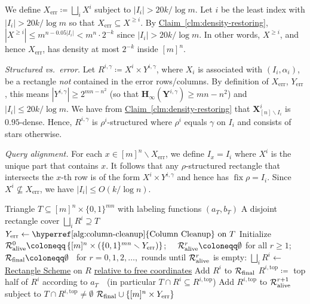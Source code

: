\documentclass[11pt]{article}
\numberwithin{equation}{section}
\theoremstyle{definition}
\theoremstyle{plain}
\newcommand{\expref}[2]{\hyperref[#2]{#1~\ref{#2}}}
\newcommand{\rectscheme}{\hyperref[alg:partition]{Rectangle Scheme}\xspace}
\newcommand{\columnclean}{\hyperref[alg:column-cleanup]{Column Cleanup}\xspace}
\newcommand{\Hmin}{\mathbf{H}_\infty}
\DeclareMathOperator{\fix}{fix}
\DeclareMathOperator{\err}{err}
\newcommand{\X}{\bm{X}}
\newcommand{\Y}{\bm{Y}}
\newcommand{\calR}{\mathcal{R}}
\newcommand{\allX}{[m]^n}
\newcommand{\allY}{\{0,1\}^{mn}}
\newcommand{\set}[1]{\left \{ #1 \right \}}
\newcommand{\alive}{\text{\upshape alive}}
\newcommand{\final}{\text{\upshape final}}
\newcommand{\topp}{\text{top}}
\begin{document}
We define $X_{\err} \coloneqq \bigsqcup_i X^i$ subject to $|I_i| > 20 k/\log m$. Let $i$ be the least index with $|I_{i}| > 20k/\log m$ so that $X_{\err} \subseteq X^{\geqslant i}$. By \expref{Claim}{clm:density-restoring}, $|X^{\geqslant i}| \le m^{n - 0.05 |I_i|} < m^{n} \cdot 2^{-k}$ since $|I_i| > 20 k /\log m$. In other words, $X^{\geqslant i}$, and hence $X_{\err}$, has density at most $2^{-k}$ inside $\allX$.
	
\medskip\noindent
\emph{Structured vs.\ error.}
Let $R^{i,\gamma}\coloneqq X^i\times Y^{i,\gamma}$, where $X_i$ is associated with $(I_i,\alpha_i)$, be a rectangle \emph{not} contained in the error rows/columns. By definition of $X_{\err}$, $Y_{\err}$, this means $|Y^{i,\gamma}| \ge 2^{mn-n^2}$ (so that $\Hmin(\Y^{i,\gamma})\geq mn-n^2$) and $|I_i| \le 20 k/\log m$. We have from \expref{Claim}{clm:density-restoring} that $\X^i_{[n] \smallsetminus {I_i}}$ is $0.95$-dense. Hence, $R^{i,\gamma}$ is $\rho^i$-structured where $\rho^i$ equals $\gamma$ on $I_i$ and consists of stars otherwise.

\medskip\noindent
\emph{Query alignment.}
For each $x \in \allX \smallsetminus X_{\err}$, we define $I_x = I_i$ where $X^i$ is the unique part that contains $x$. It follows that any $\rho$-structured rectangle that intersects the $x$-th row is of the form $X^i \times Y^{i,\gamma}$ and hence has $\fix \rho = I_i$. Since $X^i \not\subseteq X_{\err}$, we have $|I_i| \le O(k/\log n)$.


\begin{algorithm}[t]
	\begin{algorithmic}[1]
		\vspace{1mm}
		\Input Triangle $T \subseteq \allX \times \allY$ with labeling functions $(a_T, b_T)$
		\Output A disjoint rectangle cover $\bigsqcup_i R^i\supseteq T$
		\vspace{4mm}
		\State $Y_{\err} \gets \text{\columnclean on } T$
		\State Initialize~ $\calR^0_{\alive} \coloneqq \set{\allX \times (\allY \smallsetminus Y_{\err})}$;~~ $\calR^r_{\alive} \coloneqq \emptyset$ for all $r\geq 1$;~~ $\calR_{\final} \coloneqq  \emptyset$
		\vspace{2mm}
		\Loop ~for $r=0,1,2,\ldots,$ rounds until $\calR^r_{\alive}$ is empty:
		\ForAll {$R \in \calR^r_{\alive}$}
		\State $\bigsqcup_i R^i \gets$ \rectscheme on $R$ \underline{relative to free coordinates}
			\State Add $R^i$ to $\calR_{\final}$
		\Else 
		\State
			$R^{i,\topp} \coloneqq $ top half of $R^i$ according to $a_T$~~(in particular $T\cap R^i\subseteq R^{i,\topp}$)
		\State Add $R^{i,\topp}$ to $\calR^{r+1}_{\alive}$ subject to $T \cap R^{i,\topp} \ne \emptyset$
		\EndIf
		\EndFor
		\EndFor
		\EndLoop
		\vspace{1.5mm}
		\State \Return $\calR_{\final} \cup \set{\allX \times Y_{\err}}$
	\end{algorithmic}
	\caption{}
	\label{alg:tri-partition}
\end{algorithm}
\end{document}
